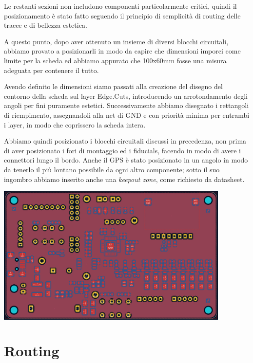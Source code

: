 Le restanti sezioni non includono componenti particolarmente critici,
quindi il posizionamento è stato fatto seguendo il principio di
semplicità di routing delle tracce e di bellezza estetica.

A questo punto, dopo aver ottenuto un insieme di diversi blocchi
circuitali, abbiamo provato a posizionarli in modo da capire che
dimensioni imporci come limite per la scheda ed abbiamo appurato che
100x60mm fosse una misura adeguata per contenere il tutto.

Avendo definito le dimensioni siamo passati alla creazione del disegno
del contorno della scheda sul layer Edge.Cuts, introducendo un
arrotondamento degli angoli per fini puramente estetici. Successivamente
abbiamo disegnato i rettangoli di riempimento, assegnandoli alla net di
GND e con priorità minima per entrambi i layer, in modo che coprissero
la scheda intera.

Abbiamo quindi posizionato i blocchi circuitali discussi in precedenza,
non prima di aver posizionato i fori di montaggio ed i fiducials,
facendo in modo di avere i connettori lungo il bordo. Anche il GPS è
stato posizionato in un angolo in modo da tenerlo il più lontano
possibile da ogni altro componente; sotto il suo ingombro abbiamo
inserito anche una \emph{keepout zone}, come richiesto da datasheet.

\begin{center}
\includegraphics[width=4.57535in,height=2.75694in]{figures/image21.png}
\captionsetup{type=figure}
\end{center}

\hypertarget{routing}{%
\section{Routing}\label{routing}}

